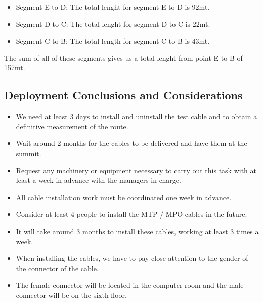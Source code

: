 \begin{itemize}
  \item Segment E to D: The total lenght for segment E to D is 92mt.
  \item Segment D to C: The total lenght for segment D to C is 22mt.
  \item Segment C to B: The total length for segment C to B is 43mt.
\end{itemize} 

The sum of all of these segments gives us a total lenght from point E to B of 157mt.

\newpage

\subsection{Deployment Conclusions and Considerations}

\begin{itemize}
    \item We need at least 3 days to install and uninstall the test cable and to obtain a definitive measurement of the route.
    \item Wait around 2 months for the cables to be delivered and have them at the summit.
    \item Request any machinery or equipment necessary to carry out this task with at least a week in advance with the managers in charge. 
    \item All cable installation work must be coordinated one week in advance.
    \item Consider at least 4 people to install the MTP / MPO cables in the future.
    \item It will take around 3 months to install these cables, working at least 3 times a week.
    \item When installing the cables, we have to pay close attention to the gender of the connector of the cable.
    \item The female connector will be located in the computer room and the male connector will be on the sixth floor.
\end{itemize}

\newpage